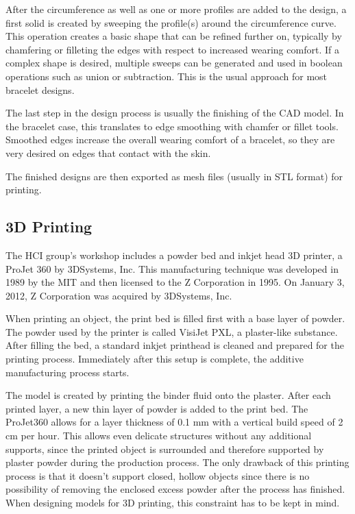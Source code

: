 After the circumference as well as one or more profiles are added to the design, a first solid is created by sweeping the profile(s) around the circumference curve. This operation creates a basic shape that can be refined further on, typically by chamfering or filleting the edges with respect to increased wearing comfort. If a complex shape is desired, multiple sweeps can be generated and used in boolean operations such as union or subtraction. This is the usual approach for most bracelet designs.

The last step in the design process is usually the finishing of the \ac{CAD} model. In the bracelet case, this translates to edge smoothing with chamfer or fillet tools. Smoothed edges increase the overall wearing comfort of a bracelet, so they are very desired on edges that contact with the skin.

The finished designs are then exported as mesh files (usually in \ac{STL} format) for printing.

\subsection{3D Printing}
The \ac{HCI} group's workshop includes a powder bed and inkjet head 3D printer, a ProJet 360 by 3DSystems, Inc\cite{printer}. This manufacturing technique was developed in 1989 by the \ac{MIT} \cite{sachs1994three} and then licensed to the Z Corporation in 1995. On January 3, 2012, Z Corporation was acquired by 3DSystems, Inc.

When printing an object, the print bed is filled first with a base layer of powder. The powder used by the printer is called VisiJet PXL, a plaster-like substance. After filling the bed, a standard inkjet printhead is cleaned and prepared for the printing process. Immediately after this setup is complete, the additive manufacturing process starts.

The model is created by printing the binder fluid onto the plaster. After each printed layer, a new thin layer of powder is added to the print bed. The ProJet360 allows for a layer thickness of 0.1 mm with a vertical build speed of 2 cm per hour\cite{datasheet_printer}. This allows even delicate structures without any additional supports, since the printed object is surrounded and therefore supported by plaster powder during the production process. The only drawback of this printing process is that it doesn't support closed, hollow objects since there is no possibility of removing the enclosed excess powder after the process has finished. When designing models for 3D printing, this constraint has to be kept in mind.

